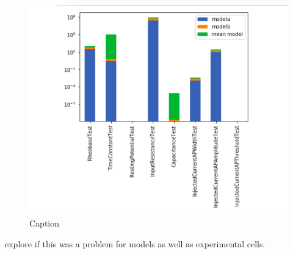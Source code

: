 \begin{figure}
    \centering
    \includegraphics{figures/mean_model_mean_test2.png}
    \caption{Caption}
    \label{fig:my_label}
\end{figure}

explore if this was a problem for models as well as experimental cells.